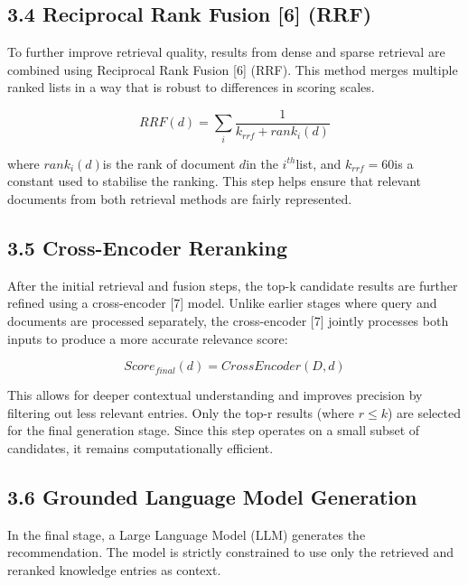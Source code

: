\subsection*{3.4 Reciprocal Rank Fusion {[}6{]}
(RRF)}\label{reciprocal-rank-fusion-6-rrf}

To further improve retrieval quality, results from dense and sparse
retrieval are combined using Reciprocal Rank Fusion {[}6{]} (RRF). This
method merges multiple ranked lists in a way that is robust to
differences in scoring scales.

\[RRF(d) = \sum_{i}^{}\frac{1}{k_{rrf} + rank_{i}(d)}
\]

where \(rank_{i}(d)\)is the rank of document \(d\)in the \(i^{th}\)list,
and \(k_{rrf} = 60\)is a constant used to stabilise the ranking. This
step helps ensure that relevant documents from both retrieval methods
are fairly represented.

\subsection*{3.5 Cross-Encoder Reranking}\label{cross-encoder-reranking}

After the initial retrieval and fusion steps, the top-k candidate
results are further refined using a cross-encoder {[}7{]} model. Unlike
earlier stages where query and documents are processed separately, the
cross-encoder {[}7{]} jointly processes both inputs to produce a more
accurate relevance score:

\[Score_{final}(d) = CrossEncoder(D,d)
\]

This allows for deeper contextual understanding and improves precision
by filtering out less relevant entries. Only the top-r results (where
\(r \leq k\)) are selected for the final generation stage. Since this
step operates on a small subset of candidates, it remains
computationally efficient.

\subsection*{3.6 Grounded Language Model
Generation}\label{grounded-language-model-generation}

In the final stage, a Large Language Model (LLM) generates the
recommendation. The model is strictly constrained to use only the
retrieved and reranked knowledge entries as context.

